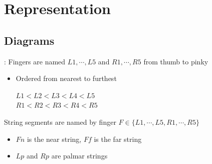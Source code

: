 \newcommand\w[1]{\texttt{[image: \#1]}}

\section{Representation}

\subsection{Diagrams}
\begin{frame}{\secname: \subsecname}
Fingers are named $L1,\cdots, L5$ and $R1,\cdots,R5$ from thumb to pinky

\begin{itemize}
    \item \pause Ordered from nearest to furthest
    \pause \begin{center}
    $L1\lt L2\lt L3\lt L4\lt L5$\\
    $R1\lt R2\lt R3\lt R4\lt R5$    
    \end{center}
\end{itemize}

\pause String segments are named by finger $F\in\{L1,\cdots, L5,R1,\cdots,R5\}$
\begin{itemize}[<+(1)->]
    \item $Fn$ is the near string, $Ff$ is the far string
    \item $Lp$ and $Rp$ are palmar strings
\end{itemize}

\pause
\begin{figure}\centering
\def\svgwidth{0.5\columnwidth}

\end{figure}


\end{frame}


